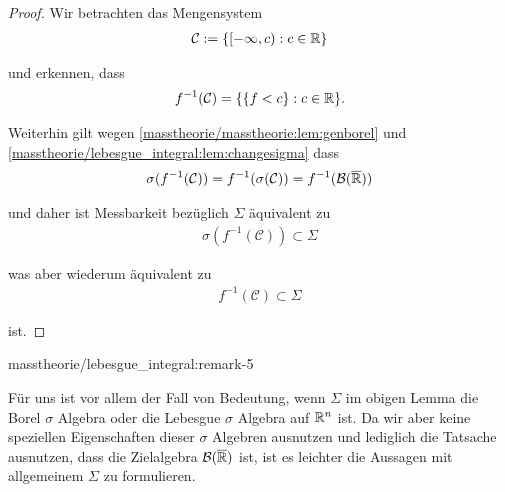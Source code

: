 \begin{proof}
 Wir betrachten das Mengensystem
\begin{align*}
\mathcal{C}:=\{[-\infty,c):c\in\mathbb{R}\}
\end{align*}
\par
und erkennen, dass
\begin{align*}
f^{-1}(\mathcal{C}) = \{\{f<c\}:c\in\mathbb{R}\}.
\end{align*}
\par
Weiterhin gilt wegen \cref{masstheorie/masstheorie:lem:genborel} und \cref{masstheorie/lebesgue_integral:lem:changesigma}  dass
\begin{align*}
\sigma(f^{-1}(\mathcal{C})) = f^{-1}(\sigma(\mathcal{C})) = f^{-1}(\mathcal{B}(\overline{\mathbb{R}}))
\end{align*}
\par
und daher ist Messbarkeit bezüglich \(\Sigma\) äquivalent zu
\begin{align*}
\sigma(f^{-1}(\mathcal{C})) \subset \Sigma
\end{align*}
\par
was aber wiederum äquivalent zu
\begin{align*}
f^{-1}(\mathcal{C}) \subset \Sigma
\end{align*}
\par
ist.
\end{proof}
\begin{remark}{}{masstheorie/lebesgue_integral:remark-5}



\par
Für uns ist vor allem der Fall von Bedeutung, wenn \(\Sigma\) im obigen Lemma die Borel \(\sigma\) Algebra oder die Lebesgue \(\sigma\) Algebra auf \(\mathbb{R}^n\) ist. Da wir aber keine speziellen Eigenschaften dieser \(\sigma\) Algebren ausnutzen und lediglich die Tatsache ausnutzen, dass die Zielalgebra \(\mathcal{B}(\overline{\mathbb{R}})\) ist, ist es leichter die Aussagen mit allgemeinem \(\Sigma\) zu formulieren.
\end{remark}

